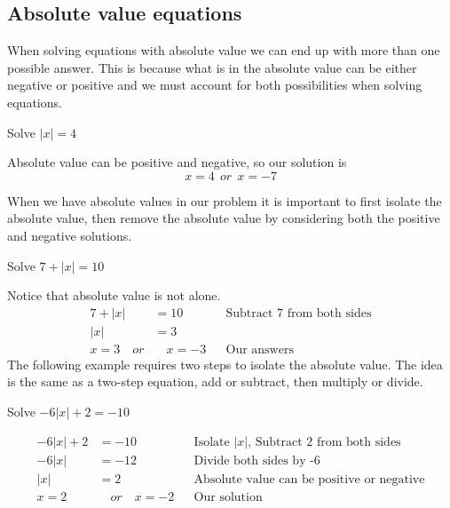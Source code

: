 \subsection{Absolute value equations}
When solving equations with absolute value we can end up with more than one
possible answer. This is because what is in the absolute value can be either negative
or positive and we must account for both possibilities when solving equations.
\begin{exa}
    Solve $|x|=4$
\end{exa}
Absolute value can be positive and negative, so our solution is\[
        x=4\ \ or\ \ x=-7
\]
\begin{nt}
When we have absolute values in our problem it is important to first isolate the absolute value, then remove the absolute value by considering both the positive and negative solutions.
\end{nt}
\begin{exa}
    Solve $7+|x|=10$
\end{exa}
Notice that absolute value is not alone. 
\begin{align*}
     7+|x| & = 10 &&\text{Subtract 7 from both sides} \\
    |x|&=3 &&\\
    x=3\quad or&\quad x=-3 &&\text{Our answers}
\end{align*}
The following example requires two steps to isolate the absolute
value. The idea is the same as a two-step equation, add or subtract, then multiply or divide.
\begin{exa}
    Solve $-6|x|+2=-10$
\end{exa}
\begin{align*}
    -6|x|+2 &= -10  &&\text{Isolate $|x|$, Subtract 2 from both sides}\\
    -6|x| &= -12    &&\text{Divide both sides by -6}\\
    |x| & =2        &&\text{Absolute value can be positive or negative}\\
    x=2&\quad   or \quad    x=-2    &&\text{Our solution}
\end{align*}
